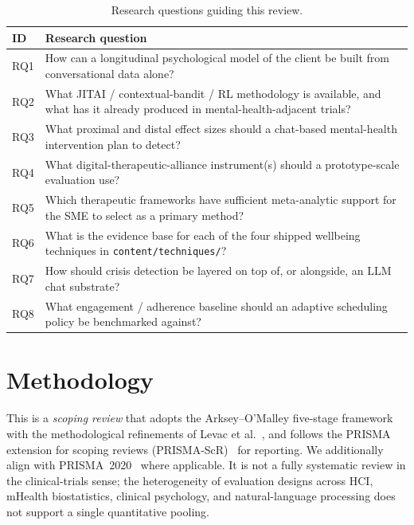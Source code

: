 \documentclass[10pt,conference]{article}
\begin{document}
\begin{table}[t]
\small
\begin{tabularx}{\textwidth}{l X}
\toprule
\textbf{ID} & \textbf{Research question} \\
\midrule
RQ1 & How can a longitudinal psychological model of the client be built from conversational data alone? \\
RQ2 & What JITAI / contextual-bandit / RL methodology is available, and what has it already produced in mental-health-adjacent trials? \\
RQ3 & What proximal and distal effect sizes should a chat-based mental-health intervention plan to detect? \\
RQ4 & What digital-therapeutic-alliance instrument(s) should a prototype-scale evaluation use? \\
RQ5 & Which therapeutic frameworks have sufficient meta-analytic support for the SME to select as a primary method? \\
RQ6 & What is the evidence base for each of the four shipped wellbeing techniques in \texttt{content/techniques/}? \\
RQ7 & How should crisis detection be layered on top of, or alongside, an LLM chat substrate? \\
RQ8 & What engagement / adherence baseline should an adaptive scheduling policy be benchmarked against? \\
\bottomrule
\end{tabularx}
\caption{Research questions guiding this review.}
\label{tab:rqs}
\end{table}

\section{Methodology}\label{sec:methodology}

This is a \emph{scoping review} that adopts the Arksey--O'Malley
five-stage framework~\cite{Arksey2005Scoping} with the methodological
refinements of Levac et al.~\cite{Levac2010Scoping}, and follows the
PRISMA extension for scoping reviews
(PRISMA-ScR)~\cite{Tricco2018PRISMAScR} for reporting. We additionally
align with PRISMA~2020~\cite{Page2021PRISMA} where applicable. It is
not a fully systematic review in the clinical-trials sense; the
heterogeneity of evaluation designs across HCI, mHealth biostatistics,
clinical psychology, and natural-language processing does not support
a single quantitative pooling.
\end{document}
